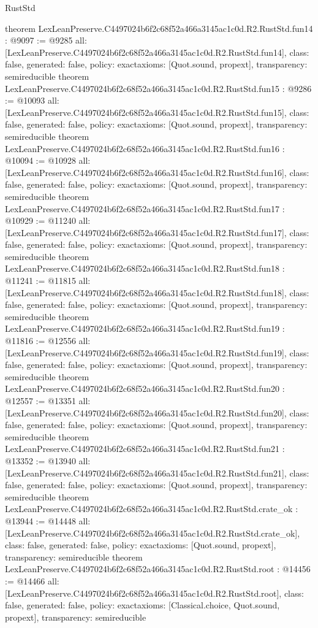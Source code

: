 \begin{lexlean}{RustStd}
\begin{coremodule}
{}
theorem LexLeanPreserve.C4497024b6f2c68f52a466a3145ac1c0d.R2.RustStd.fun14 : @9097 := @9285 {
  all: [LexLeanPreserve.C4497024b6f2c68f52a466a3145ac1c0d.R2.RustStd.fun14],
  class: false,
  generated: false,
  policy: exact{axioms: [Quot.sound, propext]},
  transparency: semireducible
}
theorem LexLeanPreserve.C4497024b6f2c68f52a466a3145ac1c0d.R2.RustStd.fun15 : @9286 := @10093 {
  all: [LexLeanPreserve.C4497024b6f2c68f52a466a3145ac1c0d.R2.RustStd.fun15],
  class: false,
  generated: false,
  policy: exact{axioms: [Quot.sound, propext]},
  transparency: semireducible
}
theorem LexLeanPreserve.C4497024b6f2c68f52a466a3145ac1c0d.R2.RustStd.fun16 : @10094 := @10928 {
  all: [LexLeanPreserve.C4497024b6f2c68f52a466a3145ac1c0d.R2.RustStd.fun16],
  class: false,
  generated: false,
  policy: exact{axioms: [Quot.sound, propext]},
  transparency: semireducible
}
theorem LexLeanPreserve.C4497024b6f2c68f52a466a3145ac1c0d.R2.RustStd.fun17 : @10929 := @11240 {
  all: [LexLeanPreserve.C4497024b6f2c68f52a466a3145ac1c0d.R2.RustStd.fun17],
  class: false,
  generated: false,
  policy: exact{axioms: [Quot.sound, propext]},
  transparency: semireducible
}
theorem LexLeanPreserve.C4497024b6f2c68f52a466a3145ac1c0d.R2.RustStd.fun18 : @11241 := @11815 {
  all: [LexLeanPreserve.C4497024b6f2c68f52a466a3145ac1c0d.R2.RustStd.fun18],
  class: false,
  generated: false,
  policy: exact{axioms: [Quot.sound, propext]},
  transparency: semireducible
}
theorem LexLeanPreserve.C4497024b6f2c68f52a466a3145ac1c0d.R2.RustStd.fun19 : @11816 := @12556 {
  all: [LexLeanPreserve.C4497024b6f2c68f52a466a3145ac1c0d.R2.RustStd.fun19],
  class: false,
  generated: false,
  policy: exact{axioms: [Quot.sound, propext]},
  transparency: semireducible
}
theorem LexLeanPreserve.C4497024b6f2c68f52a466a3145ac1c0d.R2.RustStd.fun20 : @12557 := @13351 {
  all: [LexLeanPreserve.C4497024b6f2c68f52a466a3145ac1c0d.R2.RustStd.fun20],
  class: false,
  generated: false,
  policy: exact{axioms: [Quot.sound, propext]},
  transparency: semireducible
}
theorem LexLeanPreserve.C4497024b6f2c68f52a466a3145ac1c0d.R2.RustStd.fun21 : @13352 := @13940 {
  all: [LexLeanPreserve.C4497024b6f2c68f52a466a3145ac1c0d.R2.RustStd.fun21],
  class: false,
  generated: false,
  policy: exact{axioms: [Quot.sound, propext]},
  transparency: semireducible
}
theorem LexLeanPreserve.C4497024b6f2c68f52a466a3145ac1c0d.R2.RustStd.crate_ok : @13944 := @14448 {
  all: [LexLeanPreserve.C4497024b6f2c68f52a466a3145ac1c0d.R2.RustStd.crate_ok],
  class: false,
  generated: false,
  policy: exact{axioms: [Quot.sound, propext]},
  transparency: semireducible
}
theorem LexLeanPreserve.C4497024b6f2c68f52a466a3145ac1c0d.R2.RustStd.root : @14456 := @14466 {
  all: [LexLeanPreserve.C4497024b6f2c68f52a466a3145ac1c0d.R2.RustStd.root],
  class: false,
  generated: false,
  policy: exact{axioms: [Classical.choice, Quot.sound, propext]},
  transparency: semireducible
}


\end{coremodule}
\end{lexlean}
